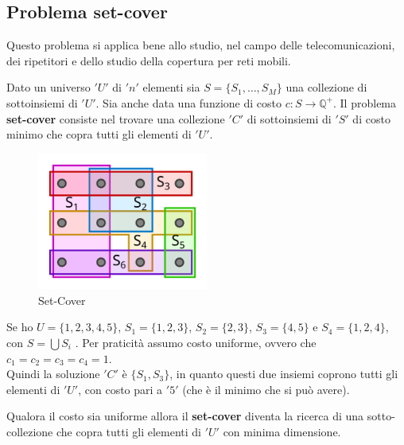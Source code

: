 							\subsection{Problema set-cover}
							Questo problema si applica bene allo studio, nel campo delle telecomunicazioni,
							dei ripetitori e dello studio della copertura per reti mobili.
							\begin{definizione}
								Dato un universo $ 'U' $ di $ 'n' $ elementi sia $S=\{S_1,\ldots,S_M\}$ una collezione
								di sottoinsiemi di $ 'U' $. Sia anche data una funzione di costo
								$c:S\to\mathbb{Q}^+$. Il problema \textbf{set-cover} consiste nel trovare una
								collezione $ 'C' $ di sottoinsiemi di $ 'S' $ di costo minimo che copra tutti gli
								elementi di $ 'U' $.
							\end{definizione}
							\begin{figure}[h!]
								\centering
								\includegraphics[width=0.5\textwidth]{img/set_cover(1).png}
								\caption{Set-Cover}
								\label{fig:Set-Cover}
							\end{figure}
							\begin{esempio}
								Se ho $U=\{1,2,3,4,5\}$, $S_1=\{1,2,3\}$, $S_2=\{2,3\}$, $S_3=\{4,5\}$ e
								$S_4=\{1,2,4\}$, con $S=\bigcup S_i$ . Per praticità assumo costo
								uniforme, ovvero che  $c_1=c_2=c_3=c_4=1$.\\
								Quindi la soluzione $ 'C' $ è $\{S_1,S_3\}$, in quanto questi due insiemi coprono
								tutti gli elementi di $ 'U' $, con costo pari a $ '5' $ (che è il minimo che si può
								avere).
							\end{esempio}
							\begin{definizione}
								Qualora il costo sia uniforme allora il \textbf{set-cover} diventa la ricerca
								di una sotto-collezione che copra tutti gli elementi di $ 'U' $ con minima
								dimensione.
							\end{definizione}
